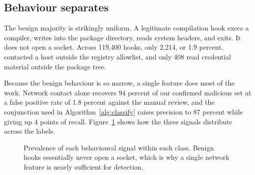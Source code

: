 \subsection{Behaviour separates}

The benign majority is strikingly uniform. A legitimate compilation hook
execs a compiler, writes into the package directory, reads system headers, and
exits. It does not open a socket. Across 119{,}400 hooks, only 2{,}214, or 1.9
percent, contacted a host outside the registry allowlist, and only 408 read
credential material outside the package tree.

Because the benign behaviour is so narrow, a single feature does most of the
work. Network contact alone recovers 94 percent of our confirmed malicious set
at a false positive rate of 1.8 percent against the manual review, and the
conjunction used in Algorithm~\ref{alg:classify} raises precision to 87 percent
while giving up 4 points of recall. Figure~\ref{fig:features} shows how the
three signals distribute across the labels.

\begin{figure}[t]
  \centering
  \caption{Prevalence of each behavioural signal within each class. Benign
  hooks essentially never open a socket, which is why a single network feature
  is nearly sufficient for detection.}
  \label{fig:features}
\end{figure}

